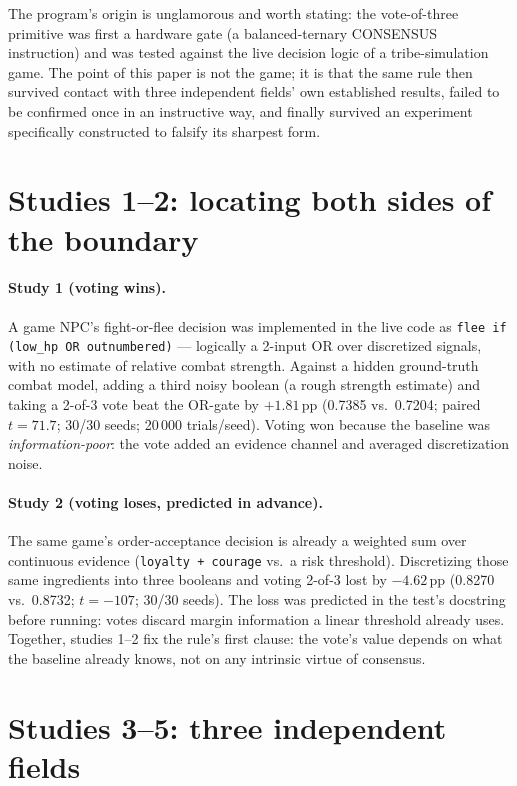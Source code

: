 \documentclass[aps,prapplied,preprint,amsmath,amssymb,floatfix]{revtex4-2}
\begin{document}
The program's origin is unglamorous and worth stating: the vote-of-three
primitive was first a hardware gate (a balanced-ternary CONSENSUS
instruction) and was tested against the live decision logic of a
tribe-simulation game. The point of this paper is not the game; it is
that the same rule then survived contact with three independent fields'
own established results, failed to be confirmed once in an instructive
way, and finally survived an experiment specifically constructed to
falsify its sharpest form.

\section{Studies 1--2: locating both sides of the boundary}

\paragraph{Study 1 (voting wins).} A game NPC's fight-or-flee decision
was implemented in the live code as \texttt{flee if (low\_hp OR
outnumbered)} --- logically a 2-input OR over discretized signals, with
no estimate of relative combat strength. Against a hidden ground-truth
combat model, adding a third noisy boolean (a rough strength estimate)
and taking a 2-of-3 vote beat the OR-gate by $+1.81$\,pp (0.7385 vs.\
0.7204; paired $t=71.7$; 30/30 seeds; 20\,000 trials/seed). Voting won
because the baseline was \emph{information-poor}: the vote added an
evidence channel and averaged discretization noise.

\paragraph{Study 2 (voting loses, predicted in advance).} The same
game's order-acceptance decision is already a weighted sum over
continuous evidence (\texttt{loyalty + courage} vs.\ a risk threshold).
Discretizing those same ingredients into three booleans and voting 2-of-3
lost by $-4.62$\,pp (0.8270 vs.\ 0.8732; $t=-107$; 30/30 seeds). The
loss was predicted in the test's docstring before running: votes discard
margin information a linear threshold already uses. Together, studies
1--2 fix the rule's first clause: the vote's value depends on what the
baseline already knows, not on any intrinsic virtue of consensus.

\section{Studies 3--5: three independent fields}
\end{document}
